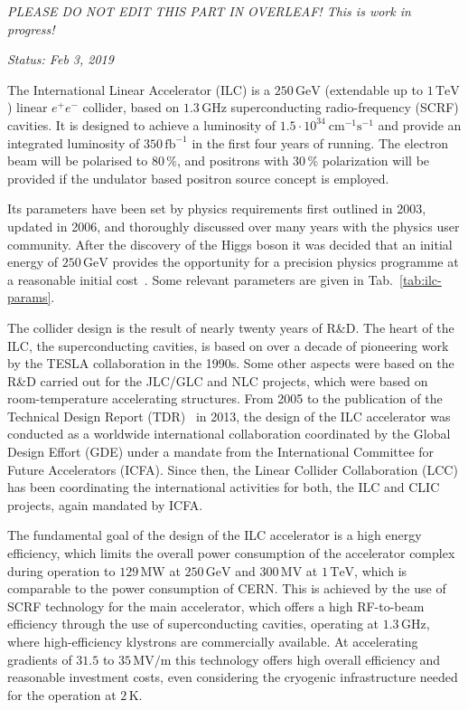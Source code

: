 
{\it PLEASE DO NOT EDIT THIS PART IN OVERLEAF! This is work in progress! }


{\it Status: Feb 3, 2019}

The International Linear Accelerator (ILC) is a $250\,{\mathrm{GeV}}$ (extendable up to $1\,{\mathrm{TeV}}$) linear $e^+e^-$ collider, based on $1.3\,{\mathrm{GHz}}$ superconducting radio-frequency (SCRF) cavities.
It is designed to  achieve a luminosity of $1.5\cdot 10^{34}~{\mathrm{cm}}^{-1}{\mathrm{s}}^{-1}$ and provide an integrated luminosity of $350\,{\mathrm{fb}}^{-1}$ in the first four years of running.
The electron beam will be polarised to $80\,\%$, and positrons with $30\,\%$ polarization will be provided if the undulator based positron source concept is employed. 

Its parameters have been set by physics requirements first outlined in 2003,
updated in 2006, and thoroughly discussed over many years with the physics user community. 
After the discovery of the Higgs boson it was decided that an initial energy of $250\,{\mathrm{GeV}}$ provides the opportunity for a precision physics programme at a reasonable initial cost~\cite{Evans:2017rvt}.
Some relevant parameters are given in Tab.~\ref{tab:ilc-params}.

The collider design is the result of nearly twenty years of R\&D. 
The heart of the ILC, the superconducting cavities, is based on over a decade of pioneering work by the TESLA collaboration in the 1990s. 
Some other aspects were based on the R\&D carried out for the JLC/GLC and NLC projects, which were based on room-temperature accelerating structures. 
From 2005 to the publication of the Technical Design Report (TDR)~\cite{Adolphsen:2013kya} in 2013, the design of the ILC accelerator was conducted as a worldwide international collaboration coordinated by the Global Design Effort (GDE) under a mandate from the International Committee for Future Accelerators (ICFA).
Since then, the Linear Collider Collaboration (LCC) has been coordinating the international activities for both, the ILC and CLIC projects, again mandated by ICFA.

The fundamental goal of the design of the ILC accelerator is a high energy efficiency, which limits the overall power consumption of the accelerator complex during operation to $129\,{\mathrm{MW}}$ at  $250\,{\mathrm{GeV}}$ and $300\,{\mathrm{MV}}$ at  $1\,{\mathrm{TeV}}$, which is comparable to the power consumption of CERN.
This is achieved by the use of SCRF technology for the main accelerator, which offers a high RF-to-beam efficiency through the use of superconducting cavities, operating at $1.3\,{\mathrm{GHz}}$, where high-efficiency klystrons are commercially available.
At accelerating gradients of $31.5$ to $35\,{\mathrm{MV/m}}$ this technology offers high overall efficiency and reasonable investment costs, even considering the cryogenic infrastructure needed for the operation at $2\,{\mathrm{K}}$.

